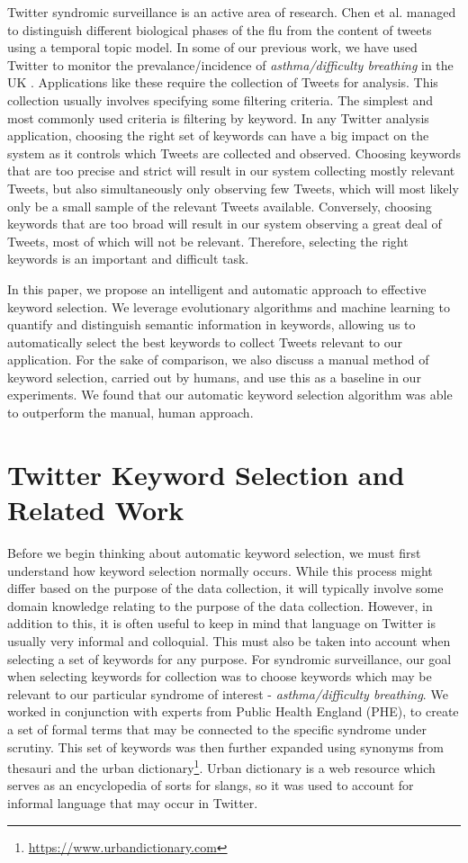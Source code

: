 \documentclass[runningheads]{llncs}
\begin{document}
Twitter syndromic surveillance is an active area of research. Chen et al. \cite{HREF5} managed to distinguish different biological phases of the flu from the content of tweets using a temporal topic model. In some of our previous work, we have used Twitter to monitor the prevalance/incidence of \textit{asthma/difficulty breathing} in the UK \cite{HREF6, HREF7, HREF8}. Applications like these require the collection of Tweets for analysis. This collection usually involves specifying some filtering criteria. The simplest and most commonly used criteria is filtering by keyword. In any Twitter analysis application, choosing the right set of keywords can have a big impact on the system as it controls which Tweets are collected and observed. Choosing keywords that are too precise and strict will result in our system collecting mostly relevant Tweets, but also simultaneously only observing few Tweets, which will most likely only be a small sample of the relevant Tweets available. Conversely, choosing keywords that are too broad will result in our system observing a great deal of Tweets, most of which will not be relevant. Therefore, selecting the right keywords is an important and difficult task. 

In this paper, we propose an intelligent and automatic approach to effective keyword selection. We leverage evolutionary algorithms and machine learning to quantify and distinguish semantic information in keywords, allowing us to automatically select the best keywords to collect Tweets relevant to our application. For the sake of comparison, we also discuss a manual method of keyword selection, carried out by humans, and use this as a baseline in our experiments. We found that our automatic keyword selection algorithm was able to outperform the manual, human approach.


\section{Twitter Keyword Selection and Related Work}\label{keyword-selection}
Before we begin thinking about automatic keyword selection, we must first understand how keyword selection normally occurs. While this process might differ based on the purpose of the data collection, it will typically involve some domain knowledge relating to the purpose of the data collection. However, in addition to this, it is often useful to keep in mind that language on Twitter is usually very informal and colloquial. This must also be taken into account when selecting a set of keywords for any purpose. For syndromic surveillance, our goal when selecting keywords for collection was to choose keywords which may be relevant to our particular syndrome of interest - \textit{asthma/difficulty breathing}. We worked in conjunction with experts from Public Health England (PHE), to create a set of formal terms that may be connected to the specific syndrome under scrutiny. This set of keywords was then further expanded using synonyms from thesauri and the urban dictionary\footnote{\url{https://www.urbandictionary.com}}. Urban dictionary is a web resource which serves as an encyclopedia of sorts for slangs, so it was used to account for informal language that may occur in Twitter.  
\end{document}
